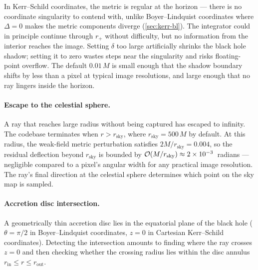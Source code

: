 In Kerr--Schild coordinates, the metric is regular at the horizon ---
there is no coordinate singularity to contend with, unlike
Boyer--Lindquist coordinates where $\Delta = 0$ makes the metric
components diverge (\cref{sec:kerr-bl}).  The integrator could in
principle continue through $r_+$ without difficulty, but no information
from the interior reaches the image.  Setting $\delta$ too large
artificially shrinks the black hole shadow; setting it to zero wastes
steps near the singularity and risks floating-point overflow.  The
default $0.01\,M$ is small enough that the shadow boundary shifts by
less than a pixel at typical image resolutions, and large enough that no
ray lingers inside the horizon.

\paragraph{Escape to the celestial sphere.}

A ray that reaches large radius without being captured has escaped to
infinity.  The codebase terminates when $r > r_{\text{sky}}$, where
$r_{\text{sky}} = 500\,M$ by default.  At this radius, the
weak-field metric perturbation satisfies $2M/r_{\text{sky}} = 0.004$,
so the residual deflection beyond $r_{\text{sky}}$ is bounded by
$\mathcal{O}\!\left(M/r_{\text{sky}}\right) \approx 2 \times 10^{-3}$~radians ---
negligible compared to a pixel's angular width for any practical image
resolution.  The ray's final direction at the celestial sphere
determines which point on the sky map is sampled.

\paragraph{Accretion disc intersection.}

A geometrically thin accretion disc lies in the equatorial plane of the
black hole ($\theta = \pi/2$ in Boyer--Lindquist coordinates, $z = 0$
in Cartesian Kerr--Schild coordinates).  Detecting the intersection
amounts to finding where the ray crosses $z = 0$ and then checking
whether the crossing radius lies within the disc annulus
$r_{\text{in}} \leq r \leq r_{\text{out}}$.


